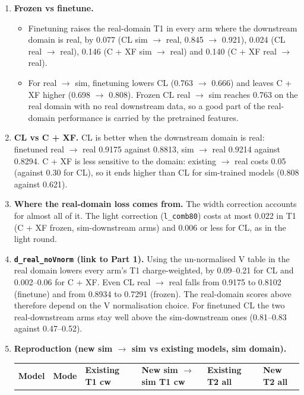 \documentclass[10pt,a4paper]{article}
\begin{document}
\begin{enumerate}
\item \textbf{Frozen vs finetune.}
\begin{itemize}
\item Finetuning raises the real-domain T1 in every arm where the downstream domain is real, by 0.077 (CL sim $\rightarrow$ real, 0.845 $\rightarrow$ 0.921), 0.024 (CL real $\rightarrow$ real), 0.146 (C + XF sim $\rightarrow$ real) and 0.140 (C + XF real $\rightarrow$ real).
\item For real $\rightarrow$ sim, finetuning lowers CL (0.763 $\rightarrow$ 0.666) and leaves C + XF higher (0.698 $\rightarrow$ 0.808). Frozen CL real $\rightarrow$ sim reaches 0.763 on the real domain with no real downstream data, so a good part of the real-domain performance is carried by the pretrained features.
\end{itemize}
\item \textbf{CL vs C + XF.} CL is better when the downstream domain is real: finetuned real $\rightarrow$ real 0.9175 against 0.8813, sim $\rightarrow$ real 0.9214 against 0.8294. C + XF is less sensitive to the domain: existing $\rightarrow$ real costs 0.05 (against 0.30 for CL), so it ends higher than CL for sim-trained models (0.808 against 0.621).
\item \textbf{Where the real-domain loss comes from.} The width correction accounts for almost all of it. The light correction (\texttt{l\_\allowbreak{}comb80}) costs at most 0.022 in T1 (C + XF frozen, sim-downstream arms) and 0.006 or less for CL, as in the light round.
\item \textbf{\texttt{d\_\allowbreak{}real\_\allowbreak{}noVnorm} (link to Part 1).} Using the un-normalised V table in the real domain lowers every arm's T1 charge-weighted, by 0.09--0.21 for CL and 0.002--0.06 for C + XF. Even CL real $\rightarrow$ real falls from 0.9175 to 0.8102 (finetune) and from 0.8934 to 0.7291 (frozen). The real-domain scores above therefore depend on the V normalisation choice. For finetuned CL the two real-downstream arms stay well above the sim-downstream ones (0.81--0.83 against 0.47--0.52).
\item \textbf{Reproduction (new sim $\rightarrow$ sim vs existing models, sim domain).}
\begin{center}\footnotesize
\setlength{\tabcolsep}{3pt}\renewcommand{\arraystretch}{1.15}
\begin{tabularx}{\linewidth}{LLLLLL}
\toprule
\textbf{Model} & \textbf{Mode} & \textbf{Existing T1 cw} & \textbf{New sim $\rightarrow$ sim T1 cw} & \textbf{Existing T2 all} & \textbf{New T2 all} \\

\end{tabularx}
\end{center}
\end{enumerate}
\end{document}
